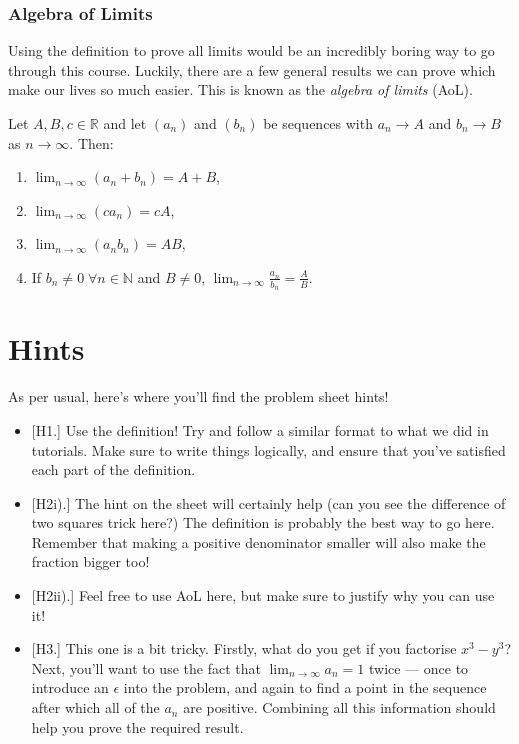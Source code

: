 \documentclass[
  10pt,
  a4paper]{article}
\providecommand{\tightlist}{%
  \setlength{\itemsep}{0pt}\setlength{\parskip}{0pt}}
\theoremstyle{plain}
\theoremstyle{definition}
\theoremstyle{plain}
\theoremstyle{plain}
\theoremstyle{plain}
\theoremstyle{plain}
\theoremstyle{definition}
\theoremstyle{definition}
\theoremstyle{remark}
\theoremstyle{remark}
\let\BeginKnitrBlock\begin \let\EndKnitrBlock\end
\begin{document}
\hypertarget{algebra-of-limits}{%
\subsubsection{Algebra of Limits}\label{algebra-of-limits}}

Using the definition to prove all limits would be an incredibly boring way to go through this course. Luckily, there are a few general results we can prove which make our lives so much easier. This is known as the \emph{algebra of limits} (AoL).

\BeginKnitrBlock{theorem}[Algebra of Limits]
{\label{thm:thm4} }Let \(A,B,c \in \mathbb{R}\) and let \((a_n)\) and \((b_n)\) be sequences with \(a_n \to A\) and \(b_n \to B\) as \(n \to \infty\). Then:

\begin{enumerate}
\def\labelenumi{\arabic{enumi}.}
\tightlist
\item
  \(\lim_{n \to \infty} (a_n + b_n) = A + B\),
\item
  \(\lim_{n \to \infty} (ca_n) = cA\),
\item
  \(\lim_{n \to \infty} (a_n b_n) = AB\),
\item
  If \(b_n \neq 0 \; \forall n \in \mathbb{N}\) and \(B \neq 0\), \(\lim_{n \to \infty} \frac{a_n}{b_n} = \frac{A}{B}\).
\end{enumerate}
\EndKnitrBlock{theorem}

\hypertarget{hints}{%
\section{Hints}\label{hints}}

As per usual, here's where you'll find the problem sheet hints!

\begin{itemize}
\tightlist
\item
  {[}H1.{]} Use the definition! Try and follow a similar format to what we did in tutorials. Make sure to write things logically, and ensure that you've satisfied each part of the definition.
\item
  {[}H2i).{]} The hint on the sheet will certainly help (can you see the difference of two squares trick here?) The definition is probably the best way to go here. Remember that making a positive denominator smaller will also make the fraction bigger too!
\item
  {[}H2ii).{]} Feel free to use AoL here, but make sure to justify why you can use it!
\item
  {[}H3.{]} This one is a bit tricky. Firstly, what do you get if you factorise \(x^3 - y^3\)? Next, you'll want to use the fact that \(\lim_{n \to \infty} a_n = 1\) twice --- once to introduce an \(\epsilon\) into the problem, and again to find a point in the sequence after which all of the \(a_n\) are positive. Combining all this information should help you prove the required result.
\end{itemize}
\end{document}
